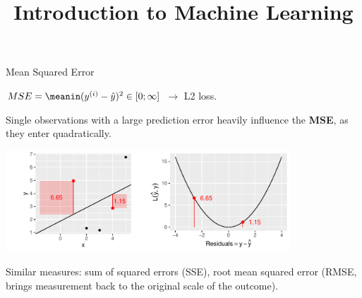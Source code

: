 \documentclass[11pt,compress,t,notes=noshow, xcolor=table]{beamer}
\title{Introduction to Machine Learning}
\institute{\href{https://compstat-lmu.github.io/lecture_i2ml/}{compstat-lmu.github.io/lecture\_i2ml}}
\date{}
\newenvironment{knitrout}{}{} %
\begin{document}

















\begin{vbframe}{Mean Squared Error}


\begin{center}
$
MSE = \meanin (\yi - \yih)^2 \in [0;\infty]
$
\hspace{4em} $\rightarrow$ L2 loss.
\end{center}

\lz

Single observations with a large prediction error heavily influence the \textbf{MSE}, as they enter quadratically.

\begin{knitrout}\scriptsize
{}\color{fgcolor}

{\centering \includegraphics[width=0.8\textwidth]{figure/plot_quad_loss} 

}



\end{knitrout}

Similar measures: sum of squared errors (SSE), root mean squared error (RMSE, brings measurement back to the original scale of the outcome).

\end{vbframe}
\end{document}
